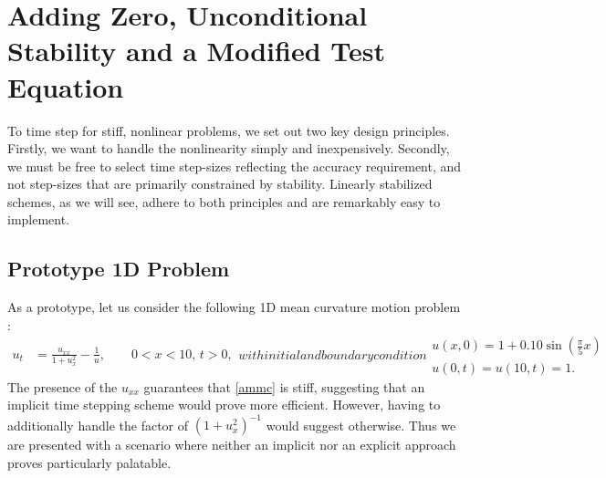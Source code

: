\chapter{Adding Zero, Unconditional Stability and a Modified Test Equation}
To time step for stiff, nonlinear problems, we set out two key design principles. Firstly, we want to handle the nonlinearity simply and inexpensively. Secondly, we must be free to select time step-sizes reflecting the accuracy requirement, and not step-sizes that are primarily constrained by stability. Linearly stabilized schemes, as we will see, adhere to both principles and are remarkably easy to implement.

\section{Prototype 1D Problem}
As a prototype, let us consider the following 1D mean curvature motion problem \cite{duchemin2014explicit}: 
\begin{subequations} 
\begin{align}
u_t &= \frac{u_{xx}}{1 + u_x^2} - \frac{1}{u}, 
\qquad 0 < x < 10, \, t > 0,
\label{ammc 1}
\end{align}
with initial and boundary condition
\begin{gather}
u(x,0) = 1 + 0.10\sin\left( \frac{\pi}{5}x \right) 
\\
u(0,t)=u(10,t)=1.
\end{gather}
\label{ammc}
\end{subequations}
The presence of the $u_{xx}$ guarantees that \eqref{ammc} is stiff, suggesting that an implicit time stepping scheme would prove more efficient. However, having to additionally handle the factor of $(1+u_x^2)^{-1}$ would suggest otherwise. Thus we are presented with a scenario where neither an implicit nor an explicit approach proves particularly palatable.

